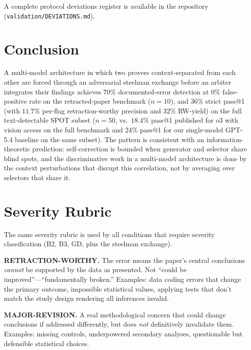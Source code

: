\documentclass[11pt]{article}
\theoremstyle{definition}
\begin{document}
A complete protocol deviations register is available in the repository
(\texttt{validation/DEVIATIONS.md}).

\section{Conclusion}
\label{sec:conclusion}

A multi-model architecture in which two provers context-separated from each other are forced through an adversarial steelman exchange before an arbiter integrates their findings achieves $70\%$ documented-error detection at $0\%$ false-positive rate on the retracted-paper benchmark ($n=10$), and $36\%$ strict pass@1 (with $11.7\%$ per-flag retraction-worthy precision and $32\%$ RW-yield) on the full text-detectable SPOT subset ($n=50$, vs.\ $18.4\%$ pass@1 published for o3 with vision access on the full benchmark and $24\%$ pass@1 for our single-model GPT-5.4 baseline on the same subset). The pattern is consistent with an information-theoretic prediction: self-correction is bounded when generator and selector share blind spots, and the discriminative work in a multi-model architecture is done by the context perturbations that disrupt this correlation, not by averaging over selectors that share it.

\appendix

\section{Severity Rubric}
\label{app:rubric}

The same severity rubric is used by all conditions that require severity classification (B2, B3, GD, plus the steelman exchange).

\medskip
\noindent\textbf{RETRACTION-WORTHY.} The error means the paper's central conclusions \emph{cannot} be supported by the data as presented. Not ``could be improved''---``fundamentally broken.'' Examples: data coding errors that change the primary outcome, impossible statistical values, applying tests that don't match the study design rendering all inferences invalid.

\medskip
\noindent\textbf{MAJOR-REVISION.} A real methodological concern that could change conclusions if addressed differently, but does \emph{not} definitively invalidate them. Examples: missing controls, underpowered secondary analyses, questionable but defensible statistical choices.
\end{document}
